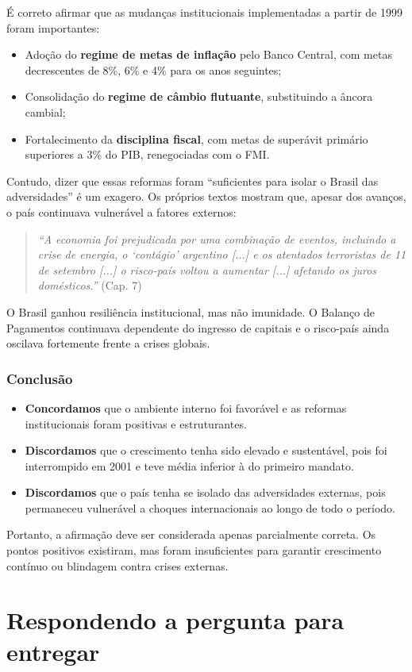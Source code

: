 \documentclass[a4paper,12pt]{article}[abntex2]
\begin{document}
É correto afirmar que as mudanças institucionais implementadas a partir de 1999 foram importantes:

\begin{itemize}
    \item Adoção do \textbf{regime de metas de inflação} pelo Banco Central, com metas decrescentes de 8\%, 6\% e 4\% para os anos seguintes;
    \item Consolidação do \textbf{regime de câmbio flutuante}, substituindo a âncora cambial;
    \item Fortalecimento da \textbf{disciplina fiscal}, com metas de superávit primário superiores a 3\% do PIB, renegociadas com o FMI.
\end{itemize}

Contudo, dizer que essas reformas foram “suficientes para isolar o Brasil das adversidades” é um exagero. Os próprios textos mostram que, apesar dos avanços, o país continuava vulnerável a fatores externos:

\begin{quote}
\textit{“A economia foi prejudicada por uma combinação de eventos, incluindo a crise de energia, o ‘contágio’ argentino [...] e os atentados terroristas de 11 de setembro [...] o risco-país voltou a aumentar [...] afetando os juros domésticos.”} (Cap. 7)
\end{quote}

O Brasil ganhou resiliência institucional, mas não imunidade. O Balanço de Pagamentos continuava dependente do ingresso de capitais e o risco-país ainda oscilava fortemente frente a crises globais.

\subsubsection{\textbf{Conclusão}}

\begin{itemize}
    \item \textbf{Concordamos} que o ambiente interno foi favorável e as reformas institucionais foram positivas e estruturantes.
    \item \textbf{Discordamos} que o crescimento tenha sido elevado e sustentável, pois foi interrompido em 2001 e teve média inferior à do primeiro mandato.
    \item \textbf{Discordamos} que o país tenha se isolado das adversidades externas, pois permaneceu vulnerável a choques internacionais ao longo de todo o período.
\end{itemize}

Portanto, a afirmação deve ser considerada apenas parcialmente correta. Os pontos positivos existiram, mas foram insuficientes para garantir crescimento contínuo ou blindagem contra crises externas.

\newpage
\section{\textbf{Respondendo a pergunta para entregar}}
\end{document}
